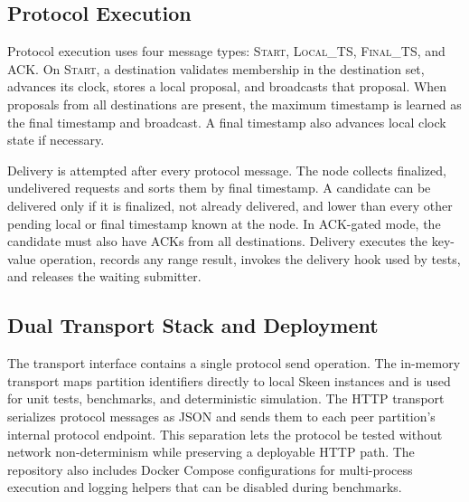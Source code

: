 \documentclass[conference]{IEEEtran}
\begin{document}
\subsection{Protocol Execution}

Protocol execution uses four message types: \textsc{Start}, \textsc{Local\_TS}, \textsc{Final\_TS}, and \textsc{ACK}. On \textsc{Start}, a destination validates membership in the destination set, advances its clock, stores a local proposal, and broadcasts that proposal. When proposals from all destinations are present, the maximum timestamp is learned as the final timestamp and broadcast. A final timestamp also advances local clock state if necessary.


Delivery is attempted after every protocol message. The node collects finalized, undelivered requests and sorts them by final timestamp. A candidate can be delivered only if it is finalized, not already delivered, and lower than every other pending local or final timestamp known at the node. In ACK-gated mode, the candidate must also have ACKs from all destinations. Delivery executes the key-value operation, records any range result, invokes the delivery hook used by tests, and releases the waiting submitter.

\subsection{Dual Transport Stack and Deployment}

The transport interface contains a single protocol send operation. The in-memory transport maps partition identifiers directly to local Skeen instances and is used for unit tests, benchmarks, and deterministic simulation. The HTTP transport serializes protocol messages as JSON and sends them to each peer partition's internal protocol endpoint. This separation lets the protocol be tested without network non-determinism while preserving a deployable HTTP path. The repository also includes Docker Compose configurations for multi-process execution and logging helpers that can be disabled during benchmarks.
\end{document}
